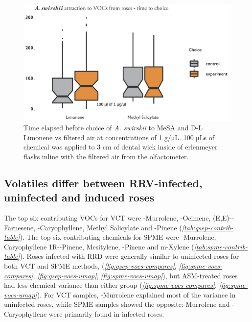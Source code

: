 \documentclass{ufdissertation}[overrideChapters] %
\begin{document}
{\begin{figure}
{\centering \includegraphics[width=1\linewidth]{figure/rrv_graph_olfact_vocs_time_choice} 

}

\caption[Time elapsed before choice of \textit{A. swirskii} to MeSA and D-L Limonene vs filtered air]{Time elapsed before choice of \textit{A. swirskii} to MeSA and D-L Limonene vs filtered air at concentrations of 1 g/\si{\micro\liter}. 100 \si{\micro\liter}s of chemical was applied to 3 cm of dental wick inside of erlenmeyer flasks inline with the filtered air from the olfactometer.}\label{fig:aswir-mesa-lim-times}
\end{figure}
\hypertarget{volatiles-differ-between-rrv-infected-uninfected-and-induced-roses}{%
\subsection{Volatiles differ between RRV-infected, uninfected and induced roses}\label{volatiles-differ-between-rrv-infected-uninfected-and-induced-roses}}

The top six contributing VOCs for VCT were \textgamma-Murrolene, \textbeta-Ocimene, (E,E)-\textalpha-Farnesene, \textbeta-Caryophyllene, Methyl Salicylate and \textbeta-Pinene (\emph{\ref{tab:qsep-contrib-table}}). The top six contributing chemicals for SPME were \textgamma-Murrolene, \textbeta-Caryophyllene 1R-\textalpha-Pinene, Mesitylene, \textbeta-Pinene and m-Xylene (\emph{\ref{tab:spme-contrib-table}}). Roses infected with RRD were generally similar to uninfected roses for both VCT and SPME methods, (\emph{\ref{fig:qsep-vocs-compares}}, \emph{\ref{fig:spme-vocs-compares}}, \emph{\ref{fig:qsep-vocs-umap}}, \emph{\ref{fig:spme-vocs-umap}}), but ASM-treated roses had less chemical variance than either group (\emph{\ref{fig:spme-vocs-compares}}, \emph{\ref{fig:spme-vocs-umap}}). For VCT samples, \textgamma-Murrolene explained most of the variance in uninfected roses, while SPME samples showed the opposite:\textgamma-Murrolene and \textbeta-Caryophyllene were primarily found in infected roses.
\begin{figure}


\end{figure}}
\end{document}
